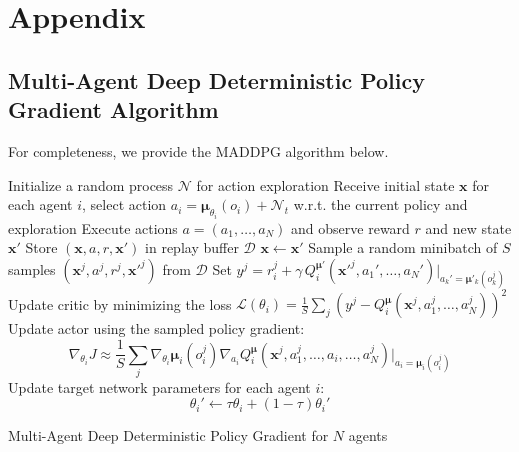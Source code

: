\documentclass{article}
\newcommand{\cpol}[0]{\pmb{\mu}}
\begin{document}













\newpage

\section*{Appendix}
\label{sec:appendix}

\subsection*{Multi-Agent Deep Deterministic Policy Gradient Algorithm}
For completeness, we provide the MADDPG algorithm below.

\begin{algorithm}[H]
 \SetAlgoLined
  \begin{algorithmic}
      \STATE Initialize a random process $\mathcal{N}$ for action exploration
      \STATE Receive initial state $\mathbf{x}$
          \STATE for each agent $i$, select action $a_i=\cpol_{\theta_i}(o_i)+\mathcal{N}_t$ w.r.t. the current policy and exploration
          \STATE Execute actions $a=(a_1,\ldots,a_N)$ and observe reward $r$ and new state $\mathbf{x}'$
          \STATE Store $(\mathbf{x},a,r,\mathbf{x}')$ in replay buffer $\mathcal{D}$
          \STATE $\mathbf{x}\gets\mathbf{x}'$
            \STATE Sample a random minibatch of $S$ samples $(\mathbf{x}^j,a^j,r^j,\mathbf{x}'^j)$ from $\mathcal{D}$
            \STATE Set $y^j=r_i^j+\gamma\, Q_i^{\cpol'}(\mathbf{x}'^j,a_1',\ldots,a_N')|_{a_k'=\cpol'_k(o_k^j)}$
            \STATE Update critic by minimizing the loss $\mathcal{L}(\theta_i)=\frac{1}{S}\sum_j\left(y^j-Q_i^{\cpol}(\mathbf{x}^j,a^j_1,\ldots,a^j_N)\right)^2$
            \STATE Update actor using the sampled policy gradient:
            $$
            \nabla_{\theta_i}J\approx\frac{1}{S}\sum_j\nabla_{\theta_i}\cpol_i(o_i^j)\nabla_{a_i}Q_i^{\cpol}(\mathbf{x}^j,a^j_1,\ldots,a_i,\ldots,a^j_N)\big|_{a_i=\cpol_i(o_i^j)}
            $$
          \ENDFOR     
          \STATE Update target network parameters for each agent $i$:
          $$
          \theta_i'\gets\tau\theta_i+(1-\tau)\theta_i'
          $$
      \ENDFOR
    \ENDFOR
  \end{algorithmic}
 \caption{Multi-Agent Deep Deterministic Policy Gradient for $N$ agents}
\end{algorithm}
\end{document}
